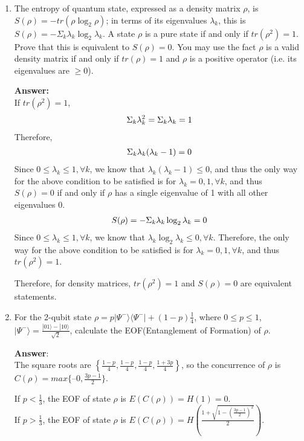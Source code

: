 \documentclass[english,aps,onecolumn]{revtex4-1}
\begin{document}
\begin{enumerate}[1.]
\item
The entropy of quantum state, expressed as a density matrix $\rho$, is $S(\rho)=-tr(\rho \log_{2}\rho)$; in terms of its eigenvalues $\lambda_{k}$, this is $S(\rho)=-\Sigma_{k}\lambda_{k}\log_{2}\lambda_{k}$. A state $\rho$ is a pure state if and only if $tr(\rho^{2})=1$. Prove that this is equivalent to $S(\rho)=0$. You
may use the fact $\rho$ is a valid density matrix if and only if $tr(\rho)=1$ and $\rho$ is a positive operator (i.e. its
eigenvalues are $\ge 0$).

\textbf{Answer:}\\
If $tr(\rho^{2})=1$,
\begin{gather}
\Sigma_{k}\lambda_{k}^{2}=\Sigma_{k}\lambda_{k}=1\notag
\end{gather}
Therefore,
\begin{gather}
\Sigma_{k}\lambda_{k}(\lambda_{k}-1)=0\notag
\end{gather}
Since $0\leq\lambda_{k}\leq 1, \forall k$, we know that $\lambda_{k}(\lambda_{k}-1)\leq 0$, and thus the only way for the above condition to be satisfied is for $\lambda_{k}=0,1,\forall k$, and thus $S(\rho)=0$ if and only if $\rho$ has a single eigenvalue of 1 with all other
eigenvalues 0.
\begin{gather}
S(\rho)=-\Sigma_{k}\lambda_{k}\log_{2}\lambda_{k}=0\notag
\end{gather}
Since $0\leq\lambda_{k}\leq 1, \forall k$, we know that $\lambda_{k}\log_{2}\lambda_{k}\leq 0,\forall k$. Therefore, the only way for the above condition to be satisfied is for $\lambda_{k}=0,1,\forall k$, and thus $tr(\rho^{2})=1$.

Therefore, for density matrices, $tr(\rho^{2})=1$ and $S(\rho)=0$ are equivalent statements.

\item
    For the 2-qubit state $\rho = p|\Psi^-\rangle \langle\Psi^{-}| + (1-p) \frac{\mathbb{I}}{4}$, where $0\leq p \leq1$, $|\Psi^-\rangle=\frac{|{01}\rangle-|{10}\rangle}{\sqrt{2}}$, calculate the EOF(Entanglement of Formation) of $\rho$.    
    
    \textbf{Answer}: \\
    The square roots are $\left\{\frac{1-p}{4} ,\frac{1-p}{4},\frac{1-p}{4},\frac{1+3p}{4}\right\}$, so the concurrence of $\rho$ is $C(\rho)= max \{–0 ,\frac{3p-1}{2}\}$.
    
    If $p < \frac{1}{3} $, the EOF of state $\rho$ is $ E(C(\rho))= H(1)=0 $. \\
    If $p > \frac{1}{3} $, the EOF of state $\rho$ is $ E(C(\rho))= H(\frac{1+\sqrt{1-(\frac{3p-1}{2})^{2}}}{2}) $.


\end{enumerate}
\end{document}
